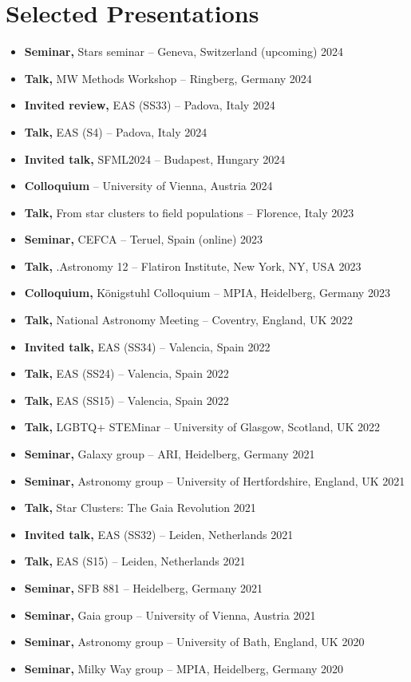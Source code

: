 \section*{Selected Presentations}

\begin{itemize}
    \item \textbf{Seminar,} Stars seminar -- Geneva, Switzerland \hfill (upcoming) 2024
    \item \textbf{Talk,} MW Methods Workshop -- Ringberg, Germany \hfill 2024
    \item \textbf{Invited review,} EAS (SS33) -- Padova, Italy \hfill 2024
    \item \textbf{Talk,} EAS (S4) -- Padova, Italy \hfill 2024
    \item \textbf{Invited talk,} SFML2024 -- Budapest, Hungary \hfill 2024
    \item \textbf{Colloquium}  -- University of Vienna, Austria \hfill 2024
    \item \textbf{Talk,} From star clusters to field populations -- Florence, Italy \hfill 2023
    \item \textbf{Seminar,} CEFCA -- Teruel, Spain (online) \hfill 2023
    \item \textbf{Talk,} .Astronomy 12 -- Flatiron Institute, New York, NY, USA \hfill 2023
    \item \textbf{Colloquium,} Königstuhl Colloquium -- MPIA, Heidelberg, Germany \hfill 2023
    \item \textbf{Talk,} National Astronomy Meeting -- Coventry, England, UK \hfill 2022
    \item \textbf{Invited talk,} EAS (SS34) -- Valencia, Spain \hfill 2022
    \item \textbf{Talk,} EAS (SS24) -- Valencia, Spain \hfill 2022
    \item \textbf{Talk,} EAS (SS15) -- Valencia, Spain \hfill 2022
    \item \textbf{Talk,} LGBTQ+ STEMinar  -- University of Glasgow, Scotland, UK \hfill 2022
    \item \textbf{Seminar,} Galaxy group -- ARI, Heidelberg, Germany \hfill 2021
    \item \textbf{Seminar,} Astronomy group -- University of Hertfordshire, England, UK \hfill 2021
    \item \textbf{Talk,} Star Clusters: The Gaia Revolution \hfill 2021
    \item \textbf{Invited talk,} EAS (SS32) -- Leiden, Netherlands \hfill 2021
    \item \textbf{Talk,} EAS (S15) -- Leiden, Netherlands \hfill 2021
    \item \textbf{Seminar,} SFB 881 -- Heidelberg, Germany \hfill 2021
    \item \textbf{Seminar,} Gaia group -- University of Vienna, Austria \hfill 2021
    \item \textbf{Seminar,} Astronomy group -- University of Bath, England, UK \hfill 2020
    \item \textbf{Seminar,} Milky Way group -- MPIA, Heidelberg, Germany \hfill 2020
\end{itemize}